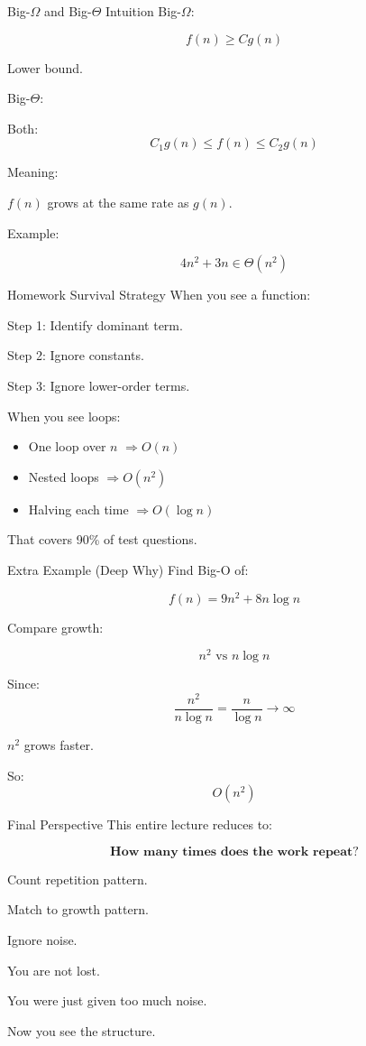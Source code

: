 \documentclass[aspectratio=169]{beamer}
\begin{document}
\begin{frame}{Big-$\Omega$ and Big-$\Theta$ Intuition}
Big-$\Omega$:

\[
f(n) \ge C g(n)
\]

Lower bound.

Big-$\Theta$:

Both:
\[
C_1 g(n) \le f(n) \le C_2 g(n)
\]

Meaning:

$f(n)$ grows at the same rate as $g(n)$.

Example:

\[
4n^2 + 3n \in \Theta(n^2)
\]
\end{frame}

\begin{frame}{Homework Survival Strategy}
When you see a function:

Step 1: Identify dominant term.

Step 2: Ignore constants.

Step 3: Ignore lower-order terms.

\bigskip

When you see loops:

\begin{itemize}
\item One loop over $n$ $\Rightarrow O(n)$
\item Nested loops $\Rightarrow O(n^2)$
\item Halving each time $\Rightarrow O(\log n)$
\end{itemize}

That covers 90\% of test questions.
\end{frame}

\begin{frame}{Extra Example (Deep Why)}
Find Big-O of:

\[
f(n) = 9n^2 + 8n\log n
\]

Compare growth:

\[
n^2 \text{ vs } n\log n
\]

Since:
\[
\frac{n^2}{n\log n} = \frac{n}{\log n} \to \infty
\]

$n^2$ grows faster.

So:
\[
O(n^2)
\]
\end{frame}

\begin{frame}{Final Perspective}
This entire lecture reduces to:

\[
\textbf{How many times does the work repeat?}
\]

Count repetition pattern.

Match to growth pattern.

Ignore noise.

\bigskip

You are not lost.

You were just given too much noise.

Now you see the structure.
\end{frame}

\end{document}
